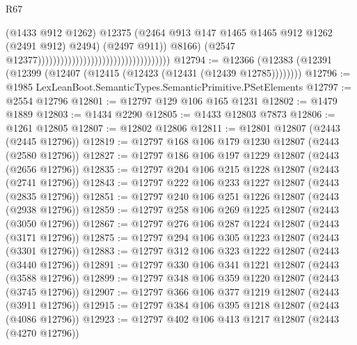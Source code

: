 \begin{lexlean}{R67}
\begin{coremodule}
                                                                            (@1433 @912 @1262)
                                                                            @12375
                                                                            (@2464
                                                                              @913
                                                                              @147
                                                                              @1465
                                                                              @1465
                                                                              @912
                                                                              @1262
                                                                              (@2491 @912)
                                                                              @2494)
                                                                            (@2497 @911))
                                                                          @8166)
                                                                        (@2547
                                                                          @12377)))))))))))))))))))))))))))))))))))
@12794 := @12366 (@12383 (@12391 (@12399 (@12407 (@12415 (@12423 (@12431 (@12439 @12785))))))))
@12796 := @1985 LexLeanBoot.SemanticTypes.SemanticPrimitive.PSetElements
@12797 := @2554 @12796
@12801 := @12797 @129 @106 @165 @1231
@12802 := @1479 @1889
@12803 := @1434 @2290
@12805 := @1433 @12803 @7873
@12806 := @1261 @12805
@12807 := @12802 @12806
@12811 := @12801 @12807 (@2443 (@2445 @12796))
@12819 := @12797 @168 @106 @179 @1230 @12807 (@2443 (@2580 @12796))
@12827 := @12797 @186 @106 @197 @1229 @12807 (@2443 (@2656 @12796))
@12835 := @12797 @204 @106 @215 @1228 @12807 (@2443 (@2741 @12796))
@12843 := @12797 @222 @106 @233 @1227 @12807 (@2443 (@2835 @12796))
@12851 := @12797 @240 @106 @251 @1226 @12807 (@2443 (@2938 @12796))
@12859 := @12797 @258 @106 @269 @1225 @12807 (@2443 (@3050 @12796))
@12867 := @12797 @276 @106 @287 @1224 @12807 (@2443 (@3171 @12796))
@12875 := @12797 @294 @106 @305 @1223 @12807 (@2443 (@3301 @12796))
@12883 := @12797 @312 @106 @323 @1222 @12807 (@2443 (@3440 @12796))
@12891 := @12797 @330 @106 @341 @1221 @12807 (@2443 (@3588 @12796))
@12899 := @12797 @348 @106 @359 @1220 @12807 (@2443 (@3745 @12796))
@12907 := @12797 @366 @106 @377 @1219 @12807 (@2443 (@3911 @12796))
@12915 := @12797 @384 @106 @395 @1218 @12807 (@2443 (@4086 @12796))
@12923 := @12797 @402 @106 @413 @1217 @12807 (@2443 (@4270 @12796))

\end{coremodule}
\end{lexlean}

